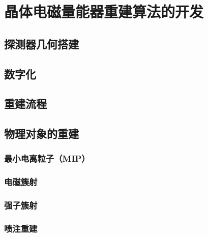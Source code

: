 \chapter{晶体电磁量能器重建算法的开发}
\label{chap:EcalRec}

\section{探测器几何搭建}
\section{数字化}
\section{重建流程}
\section{物理对象的重建}
\subsection{最小电离粒子（MIP）}
\subsection{电磁簇射}
\subsection{强子簇射}
\subsection{喷注重建}

